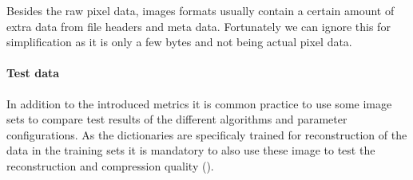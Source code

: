 
Besides the raw pixel data, images formats usually contain a certain amount
of extra data from file headers and meta data. Fortunately we can ignore this
for simplification as it is only a few bytes and not being actual pixel data.

\paragraph{Test data}
In addition to the introduced metrics it is common practice to use some image
sets to compare test results of the different algorithms and parameter
configurations. As the dictionaries are specificaly trained for
reconstruction of the data in the training sets it is mandatory to also use
these image to test the reconstruction and compression quality
().
